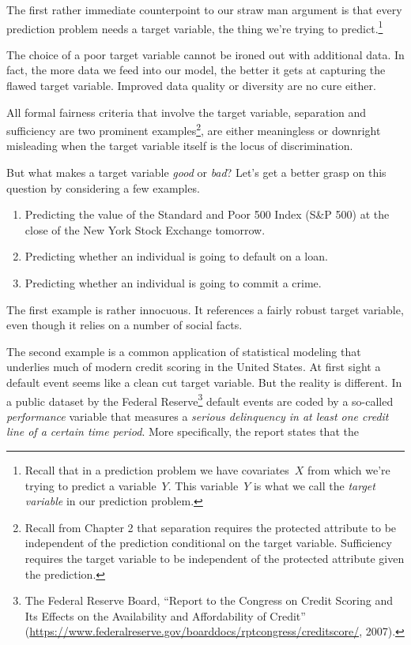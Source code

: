 \documentclass{tufte-book}
\begin{document}
The first rather immediate counterpoint to our straw man argument is
that every prediction problem needs a target variable, the thing we're
trying to predict.\footnote{Recall that in a prediction problem we have
  covariates~\(X\) from which we're trying to predict a variable~\(Y\).
  This variable~\(Y\) is what we call the \emph{target variable} in our
  prediction problem.}

The choice of a poor target variable cannot be ironed out with
additional data. In fact, the more data we feed into our model, the
better it gets at capturing the flawed target variable. Improved data
quality or diversity are no cure either.

All formal fairness criteria that involve the target variable,
separation and sufficiency are two prominent examples\footnote{Recall
  from Chapter 2 that separation requires the protected attribute to be
  independent of the prediction conditional on the target variable.
  Sufficiency requires the target variable to be independent of the
  protected attribute given the prediction.}, are
either meaningless or downright misleading when the target variable
itself is the locus of discrimination.

But what makes a target variable \emph{good} or \emph{bad}? Let's get a
better grasp on this question by considering a few examples.

\begin{enumerate}
\def\labelenumi{\arabic{enumi}.}
\tightlist
\item
  Predicting the value of the Standard and Poor 500 Index (S\&P 500) at
  the close of the New York Stock Exchange tomorrow.
\item
  Predicting whether an individual is going to default on a loan.
\item
  Predicting whether an individual is going to commit a crime.
\end{enumerate}

The first example is rather innocuous. It references a fairly robust
target variable, even though it relies on a number of social facts.

The second example is a common application of statistical modeling that
underlies much of modern credit scoring in the United States. At first
sight a default event seems like a clean cut target variable. But the
reality is different. In a public dataset by the Federal
Reserve\footnote{The Federal Reserve Board, {``Report to the Congress on
  Credit Scoring and Its Effects on the Availability and Affordability
  of Credit''}
  (\url{https://www.federalreserve.gov/boarddocs/rptcongress/creditscore/},
  2007).} default events are coded by a so-called \emph{performance}
variable that measures a \emph{serious delinquency in at least one
credit line of a certain time period}. More specifically, the report
states that the
\end{document}
